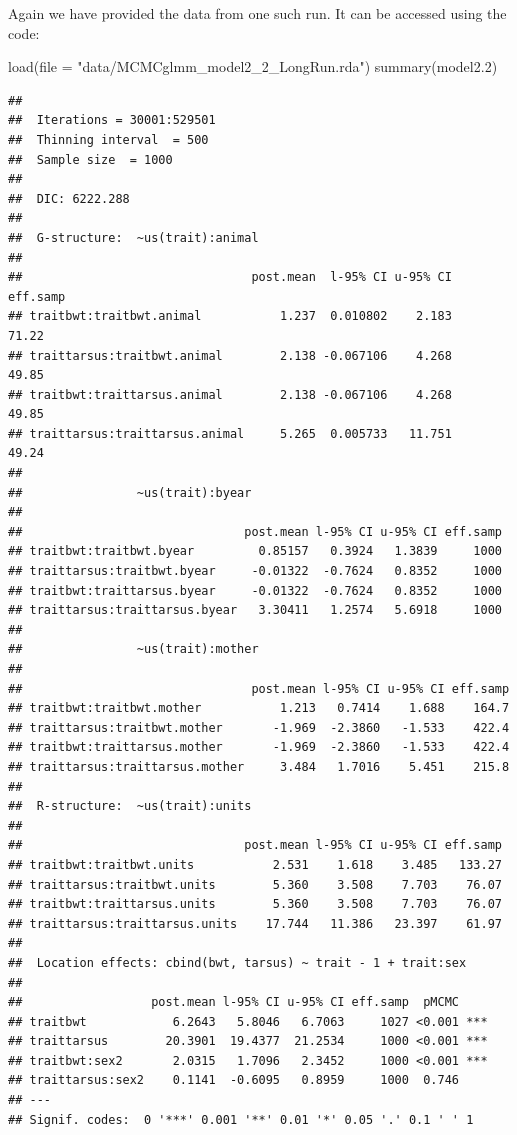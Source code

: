 \documentclass[
  12pt,
]{book}
\newenvironment{Shaded}{\begin{snugshade}}{\end{snugshade}}
\newcommand{\AttributeTok}[1]{\textcolor[rgb]{0.77,0.63,0.00}{#1}}
\newcommand{\FloatTok}[1]{\textcolor[rgb]{0.00,0.00,0.81}{#1}}
\newcommand{\FunctionTok}[1]{\textcolor[rgb]{0.00,0.00,0.00}{#1}}
\newcommand{\NormalTok}[1]{#1}
\newcommand{\StringTok}[1]{\textcolor[rgb]{0.31,0.60,0.02}{#1}}
\begin{document}
Again we have provided the data from one such run. It can be accessed using the code:

\begin{Shaded}
\begin{Highlighting}[]
\FunctionTok{load}\NormalTok{(}\AttributeTok{file =} \StringTok{"data/MCMCglmm\_model2\_2\_LongRun.rda"}\NormalTok{)}
\FunctionTok{summary}\NormalTok{(model2}\FloatTok{.2}\NormalTok{)}
\end{Highlighting}
\end{Shaded}

\begin{verbatim}
## 
##  Iterations = 30001:529501
##  Thinning interval  = 500
##  Sample size  = 1000 
## 
##  DIC: 6222.288 
## 
##  G-structure:  ~us(trait):animal
## 
##                                post.mean  l-95% CI u-95% CI eff.samp
## traitbwt:traitbwt.animal           1.237  0.010802    2.183    71.22
## traittarsus:traitbwt.animal        2.138 -0.067106    4.268    49.85
## traitbwt:traittarsus.animal        2.138 -0.067106    4.268    49.85
## traittarsus:traittarsus.animal     5.265  0.005733   11.751    49.24
## 
##                ~us(trait):byear
## 
##                               post.mean l-95% CI u-95% CI eff.samp
## traitbwt:traitbwt.byear         0.85157   0.3924   1.3839     1000
## traittarsus:traitbwt.byear     -0.01322  -0.7624   0.8352     1000
## traitbwt:traittarsus.byear     -0.01322  -0.7624   0.8352     1000
## traittarsus:traittarsus.byear   3.30411   1.2574   5.6918     1000
## 
##                ~us(trait):mother
## 
##                                post.mean l-95% CI u-95% CI eff.samp
## traitbwt:traitbwt.mother           1.213   0.7414    1.688    164.7
## traittarsus:traitbwt.mother       -1.969  -2.3860   -1.533    422.4
## traitbwt:traittarsus.mother       -1.969  -2.3860   -1.533    422.4
## traittarsus:traittarsus.mother     3.484   1.7016    5.451    215.8
## 
##  R-structure:  ~us(trait):units
## 
##                               post.mean l-95% CI u-95% CI eff.samp
## traitbwt:traitbwt.units           2.531    1.618    3.485   133.27
## traittarsus:traitbwt.units        5.360    3.508    7.703    76.07
## traitbwt:traittarsus.units        5.360    3.508    7.703    76.07
## traittarsus:traittarsus.units    17.744   11.386   23.397    61.97
## 
##  Location effects: cbind(bwt, tarsus) ~ trait - 1 + trait:sex 
## 
##                  post.mean l-95% CI u-95% CI eff.samp  pMCMC    
## traitbwt            6.2643   5.8046   6.7063     1027 <0.001 ***
## traittarsus        20.3901  19.4377  21.2534     1000 <0.001 ***
## traitbwt:sex2       2.0315   1.7096   2.3452     1000 <0.001 ***
## traittarsus:sex2    0.1141  -0.6095   0.8959     1000  0.746    
## ---
## Signif. codes:  0 '***' 0.001 '**' 0.01 '*' 0.05 '.' 0.1 ' ' 1
\end{verbatim}
\end{document}
